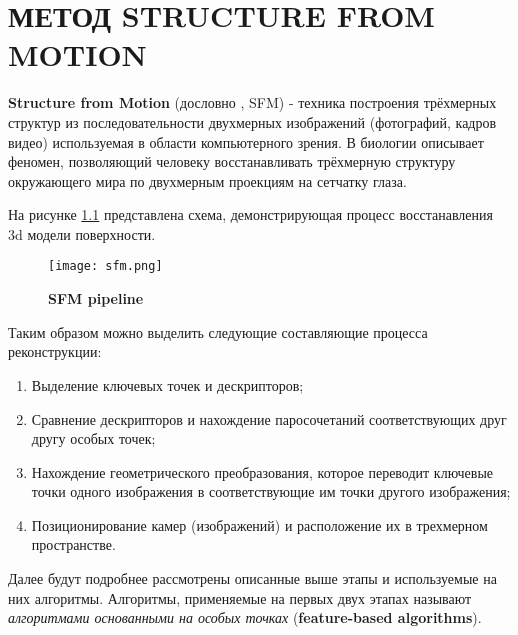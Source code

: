 \chapter{МЕТОД STRUCTURE FROM MOTION}

\textbf{Structure from Motion} (дословно , SFM) - техника построения трёхмерных структур из последовательности двухмерных изображений (фотографий, кадров видео) используемая в области компьютерного зрения. В биологии описывает феномен, позволяющий человеку восстанавливать трёхмерную структуру окружающего мира по двухмерным проекциям на сетчатку глаза.

На рисунке \ref{fig:sfm} представлена схема, демонстрирующая процесс восстанавления 3d модели поверхности.

\begin{figure}[h]
    \centering
    \texttt{[image: sfm.png]}
    \caption{\textbf{SFM pipeline}}
    \label{fig:sfm}
\end{figure}

Таким образом можно выделить следующие составляющие процесса реконструкции: 

\begin{enumerate}
    \item Выделение ключевых точек и дескрипторов;
    \item Сравнение дескрипторов и нахождение паросочетаний соответствующих друг другу особых точек;
    \item Нахождение геометрического преобразования, которое переводит ключевые точки одного изображения в соответствующие им точки другого изображения;
    \item Позиционирование камер (изображений) и расположение их в трехмерном пространстве.
\end{enumerate}

Далее будут подробнее рассмотрены описанные выше этапы и используемые на них алгоритмы. Алгоритмы, применяемые на первых двух этапах называют \textit{алгоритмами основанными на особых точках} (\textbf{feature-based algorithms}).
